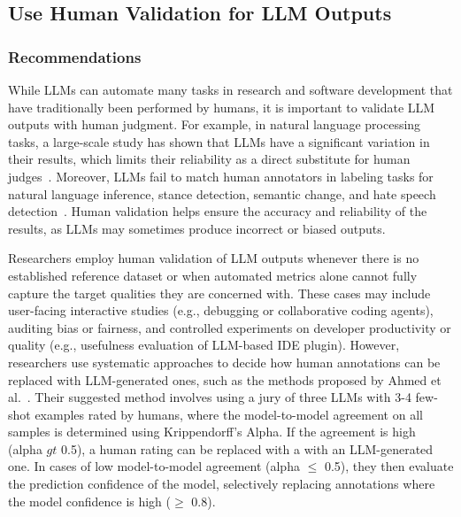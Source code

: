 



\subsection{Use Human Validation for LLM Outputs}

\subsubsection{Recommendations}

While LLMs can automate many tasks in research and software development that have traditionally been performed by humans, it is important to validate LLM outputs with human judgment.
For example, in natural language processing tasks, a large-scale study has shown that LLMs have a significant variation in their results, which limits their reliability as a direct substitute for human judges~\cite{DBLP:journals/corr/abs-2406-18403}. 
Moreover, LLMs fail to match human annotators in labeling tasks for natural language inference, stance detection, semantic change, and hate speech detection~\cite{DBLP:conf/chi/Wang0RMM24}.
Human validation helps ensure the accuracy and reliability of the results, as LLMs may sometimes produce incorrect or biased outputs.

Researchers \should employ human validation of LLM outputs whenever there is no established reference dataset or when automated metrics alone cannot fully capture the target qualities they are concerned with.
These cases may include user-facing interactive studies (e.g., debugging or collaborative coding agents), auditing bias or fairness, and controlled experiments on developer productivity or quality (e.g., usefulness evaluation of LLM-based IDE plugin).
However, researchers \should use systematic approaches to decide how human annotations can be replaced with LLM-generated ones, such as the methods proposed by Ahmed et al.~\cite{DBLP:journals/corr/abs-2408-05534}.
Their suggested method involves using a jury of three LLMs with 3-4 few-shot examples rated by humans, where the model-to-model agreement on all samples is determined using Krippendorff's Alpha.
If the agreement is high (alpha $gt$ 0.5), a human rating can be replaced with a with an LLM-generated one.
In cases of low model-to-model agreement (alpha $\le$ 0.5), they then evaluate the prediction confidence of the model, selectively replacing annotations where the model confidence is high ($\ge$ 0.8).

